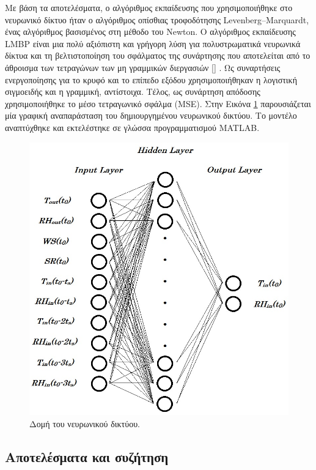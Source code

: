 \documentclass[12pt, a4paper]{report} %
\DeclareRobustCommand{\lcitep}[1]{%
  \english{[\cite{#1}]}%
}
\newcommand{\english}{\foreignlanguage{english}}
\begin{document}
Με βάση τα αποτελέσματα, ο αλγόριθμος εκπαίδευσης που χρησιμοποιήθηκε στο νευρωνικό δίκτυο ήταν ο αλγόριθμος οπίσθιας 
τροφοδότησης \english{Levenberg–Marquardt}, ένας αλγόριθμος βασισμένος στη μέθοδο του \english{Newton}. Ο αλγόριθμος 
εκπαίδευσης \english{LMBP} είναι μια πολύ αξιόπιστη και γρήγορη λύση για πολυστρωματικά νευρωνικά δίκτυα και τη 
βελτιστοποίηση του σφάλματος της συνάρτησης που αποτελείται από το άθροισμα των τετραγώνων των μη γραμμικών διεργασιών 
\lcitep{neural_bib19,neural_bib20}. Ως συναρτήσεις ενεργοποίησης για το κρυφό και το επίπεδο εξόδου χρησιμοποιήθηκαν 
η λογιστική σιγμοειδής και η γραμμική, αντίστοιχα. Τέλος, ως συνάρτηση απόδοσης χρησιμοποιήθηκε το μέσο τετραγωνικό 
σφάλμα (\english{MSE}). Στην Εικόνα \ref{fig_NN_struct} παρουσιάζεται μία γραφική αναπαράσταση του δημιουργημένου 
νευρωνικού δικτύου. Το μοντέλο αναπτύχθηκε και εκτελέστηκε σε γλώσσα προγραμματισμού \english{MATLAB}.

\begin{figure}[ht]%
    \centering
    \includegraphics[scale=0.45]{Figures/NN_struct.jpg}
    \caption{Δομή του νευρωνικού δικτύου.}
    \label{fig_NN_struct}
\end{figure}

\subsection{Αποτελέσματα και συζήτηση}\label{sub_NN_results_disc}
\end{document}

